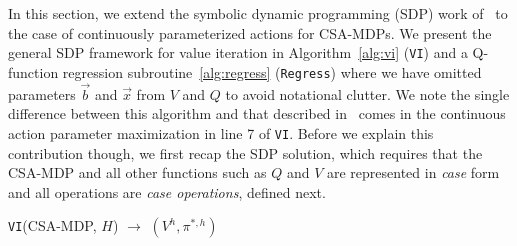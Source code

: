 \label{sec:sdp}

In this section, we extend the symbolic dynamic programming (SDP) work
of~\cite{sanner_uai11} to the case of continuously parameterized
actions for CSA-MDPs.  We present the general SDP framework for value
iteration in Algorithm~\ref{alg:vi} (\texttt{VI}) and a Q-function
regression subroutine~\ref{alg:regress} (\texttt{Regress}) where we
have omitted parameters $\vec{b}$ and $\vec{x}$ from $V$ and $Q$ to
avoid notational clutter.  We note the single difference between this
algorithm and that described in~\cite{sanner_uai11} comes in the
continuous action parameter maximization in line 7 of \texttt{VI}.
Before we explain this contribution though, we first recap the SDP
solution, which requires that the CSA-MDP and all other
functions such as $Q$ and $V$ are represented in \emph{case} form and
all operations are \emph{case operations}, defined next.

\incmargin{.5em}
\linesnumbered
\begin{algorithm}[t!]
\dontprintsemicolon
{}
\caption{\footnotesize \texttt{VI}(CSA-MDP, $H$) $\longrightarrow$ $(V^h,\pi^{*,h})$ \label{alg:vi}}
\end{algorithm}
\decmargin{.5em}


